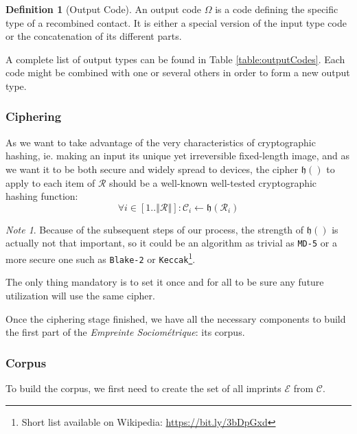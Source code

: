 \documentclass[twoside,twocolumn]{article}
\newcommand{\norm}[1]{\left\Vert#1\right\Vert}
\theoremstyle{definition}
\newtheorem{definition}{Definition}
\theoremstyle{remark}
\newtheorem*{remark}{Note}
\begin{document}
\begin{definition}[Output Code]
    \label{outputCode}
    An output code $\Omega$ is a code defining the specific type of a recombined contact. It is either a special version of the input type code or the 
    concatenation of its different parts.

    A complete list of output types can be found in Table \ref{table:outputCodes}. Each code might be combined with one or several others in order to 
    form a new output type.
\end{definition}

\subsubsection{Ciphering}

As we want to take advantage of the very characteristics of cryptographic hashing, ie. making an input its unique yet irreversible fixed-length image, 
and as we want it to be both secure and widely spread to devices, the cipher $\mathfrak{h}()$ to apply to each item of $\mathcal{R}$ should be a 
well-known well-tested cryptographic hashing function:
\begin{equation}
    \label{eq:ciphering}
    \forall i \in [1..\norm{\mathcal{R}}]: \mathcal{C}_i \gets \mathfrak{h}(\mathcal{R}_i)
\end{equation}

\begin{remark}
    Because of the subsequent steps of our process, the strength of $\mathfrak{h}()$ is actually not that important, so it could be an algorithm as 
    trivial as \texttt{MD-5} or a more secure one such as \texttt{Blake-2} or \texttt{Keccak}\footnote{Short list available on Wikipedia: 
    \url{https://bit.ly/3bDpGxd}}.

    The only thing mandatory is to set it once and for all to be sure any future utilization will use the same cipher.
\end{remark}

Once the ciphering stage finished, we have all the necessary components to build the first part of the \emph{Empreinte Sociométrique}: its corpus.

\subsubsection{Corpus}

To build the corpus, we first need to create the set of all imprints $\mathcal{E}$ from $\mathcal{C}$.
\end{document}
